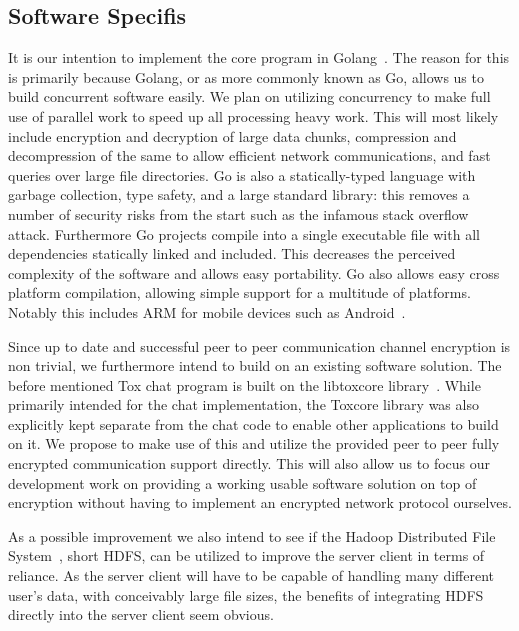 \documentclass[a4paper,10pt,twoside]{article}
\begin{document}
\subsection{Software Specifis}

It is our intention to implement the core program in Golang~\cite{web:site:golang}.
The reason for this is primarily because Golang, or as more commonly known as Go, allows us to build concurrent software easily.
We plan on utilizing concurrency to make full use of parallel work to speed up all processing heavy work.
This will most likely include encryption and decryption of large data chunks, compression and decompression of the same to allow efficient network communications, and fast queries over large file directories.
Go is also a statically-typed language with garbage collection, type safety, and a large standard library: this removes a number of security risks from the start such as the infamous stack overflow attack.
Furthermore Go projects compile into a single executable file with all dependencies statically linked and included.
This decreases the perceived complexity of the software and allows easy portability.
Go also allows easy cross platform compilation, allowing simple support for a multitude of platforms.
Notably this includes ARM for mobile devices such as Android~\cite{web:site:android}.

Since up to date and successful peer to peer communication channel encryption is non trivial, we furthermore intend to build on an existing software solution.
The before mentioned Tox chat program is built on the libtoxcore library~\cite{web:site:toxcore}.
While primarily intended for the chat implementation, the Toxcore library was also explicitly kept separate from the chat code to enable other applications to build on it.
We propose to make use of this and utilize the provided peer to peer fully encrypted communication support directly.
This will also allow us to focus our development work on providing a working usable software solution on top of encryption without having to implement an encrypted network protocol ourselves.

As a possible improvement we also intend to see if the Hadoop Distributed File System~\cite{web:site:hadoop}, short HDFS, can be utilized to improve the server client in terms of reliance.
As the server client will have to be capable of handling many different user's data, with conceivably large file sizes, the benefits of integrating HDFS directly into the server client seem obvious.
\end{document}
